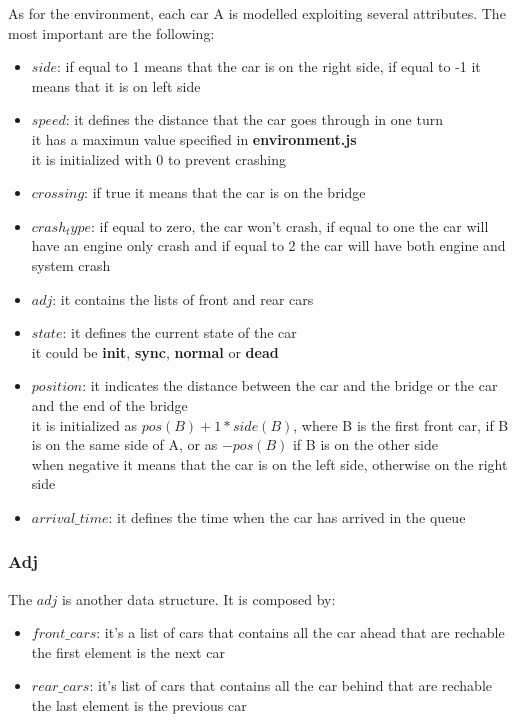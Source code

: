 As for the environment, each car A is modelled exploiting several attributes. The most important
are the following:
\begin{itemize}
    \item $side$: if equal to 1 means that the car is on the right side, 
    if equal to -1 it means that it is on left side
    \item $speed$: it defines the distance that the car goes through in one turn\\
    it has a maximun value specified in \textbf{environment.js}\\
    it is initialized with 0 to prevent crashing 
    \item $crossing$: if true it means that the car is on the bridge
    \item $crash_type$: if equal to zero, the car won't crash, if equal to one the car will have an engine only crash
    and if equal to 2 the car will have both engine and system crash 
    \item $adj$: it contains the lists of front and rear cars
    \item $state$: it defines the current state of the car\\ it could be \textbf{init}, \textbf{sync}, \textbf{normal} or \textbf{dead}
    \item $position$: it indicates the distance between the car and the bridge or the car and the end of the
    bridge\\it is initialized as $pos(B)+1*side(B)$, where B is the first front car, if B is on the same side of A, or
    as $-pos(B)$ if B is on the other side\\ when negative it means that the car is on the left side, otherwise on the right side
    \item $arrival\_time$: it defines the time when the car has arrived in the queue
\end{itemize}

\subsubsection{Adj}
The $adj$ is another data structure. It is composed by:
\begin{itemize}
    \item $front\_cars$: it's a list of cars that contains all the car ahead that are rechable\\ the first element
     is the next car
    \item $rear\_cars$: it's list of cars that contains all the car behind that are rechable\\ the last element
     is the previous car
\end{itemize} 

